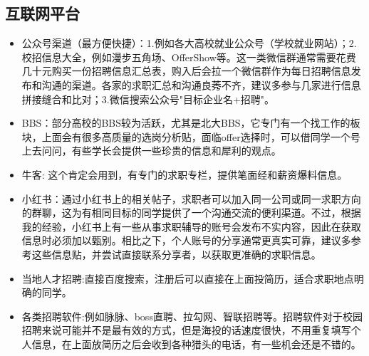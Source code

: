 \subsection{互联网平台}
\begin{itemize}
    \item 公众号渠道（最方便快捷）：1.例如各大高校就业公众号（学校就业网站）；2.校招信息大全，例如漫步五角场、OfferShow等。这一类微信群通常需要花费几十元购买一份招聘信息汇总表，购入后会拉一个微信群作为每日招聘信息发布和沟通的渠道。各家的求职汇总和沟通良莠不齐，建议多参与几家进行信息拼接缝合和比对；3.微信搜索公众号"目标企业名+招聘"。
        
    \item BBS：部分高校的BBS较为活跃，尤其是北大BBS，它专门有一个找工作的板块，上面会有很多高质量的选岗分析贴，面临offer选择时，可以借同学一个号上去问问，有些学长会提供一些珍贵的信息和犀利的观点。
    \item 牛客: 这个肯定会用到，有专门的求职专栏，提供笔面经和薪资爆料信息。
    \item 小红书：通过小红书上的相关帖子，求职者可以加入同一公司或同一求职方向的群聊，这为有相同目标的同学提供了一个沟通交流的便利渠道。不过，根据我的经验，小红书上有一些从事求职辅导的账号会发布不实内容，因此在获取信息时必须加以甄别。相比之下，个人账号的分享通常更真实可靠，建议多参考这些信息贴，并尝试直接联系分享者，以获取更准确的求职信息。
    \item 当地人才招聘:直接百度搜索，注册后可以直接在上面投简历，适合求职地点明确的同学。 
    \item 各类招聘软件:例如脉脉、boss直聘、拉勾网、智联招聘等。招聘软件对于校园招聘来说可能并不是最有效的方式，但是海投的话速度很快，不用重复填写个人信息，在上面放简历之后会收到各种猎头的电话，有一些机会还是不错的。
\end{itemize}
